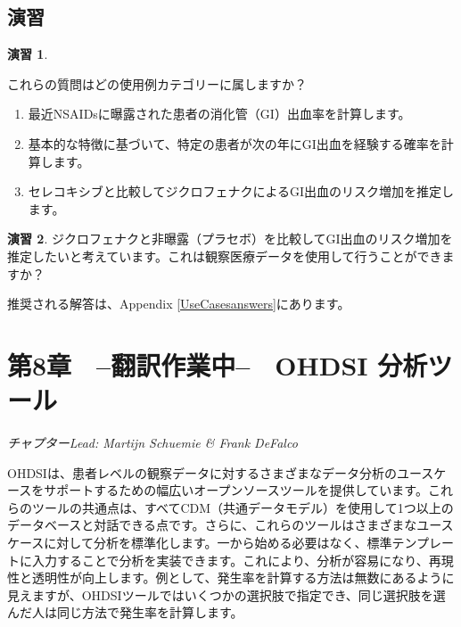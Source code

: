 \documentclass[
  11pt]{book}
\theoremstyle{definition}
\theoremstyle{definition}
\theoremstyle{definition}
\newtheorem{exercise}{演習}[chapter]
\theoremstyle{definition}
\theoremstyle{remark}
\begin{document}
\section{演習}\label{ux6f14ux7fd2-2}

\begin{exercise}
\protect\hypertarget{exr:exerciseUseCases1}{}\label{exr:exerciseUseCases1}

これらの質問はどの使用例カテゴリーに属しますか？

\begin{enumerate}
\def\labelenumi{\arabic{enumi}.}
\item
  最近NSAIDsに曝露された患者の消化管（GI）出血率を計算します。
\item
  基本的な特徴に基づいて、特定の患者が次の年にGI出血を経験する確率を計算します。
\item
  セレコキシブと比較してジクロフェナクによるGI出血のリスク増加を推定します。
\end{enumerate}

\end{exercise}

\begin{exercise}
\protect\hypertarget{exr:exerciseUseCases2}{}\label{exr:exerciseUseCases2}ジクロフェナクと非曝露（プラセボ）を比較してGI出血のリスク増加を推定したいと考えています。これは観察医療データを使用して行うことができますか？
\end{exercise}

推奨される解答は、Appendix \ref{UseCasesanswers}にあります。

\chapter{第8章　--翻訳作業中--　OHDSI 分析ツール}\label{OhdsiAnalyticsTools}

\emph{チャプターLead: Martijn Schuemie \& Frank DeFalco}

OHDSIは、患者レベルの観察データに対するさまざまなデータ分析のユースケースをサポートするための幅広いオープンソースツールを提供しています。これらのツールの共通点は、すべてCDM（共通データモデル）を使用して1つ以上のデータベースと対話できる点です。さらに、これらのツールはさまざまなユースケースに対して分析を標準化します。一から始める必要はなく、標準テンプレートに入力することで分析を実装できます。これにより、分析が容易になり、再現性と透明性が向上します。例として、発生率を計算する方法は無数にあるように見えますが、OHDSIツールではいくつかの選択肢で指定でき、同じ選択肢を選んだ人は同じ方法で発生率を計算します。
\end{document}
